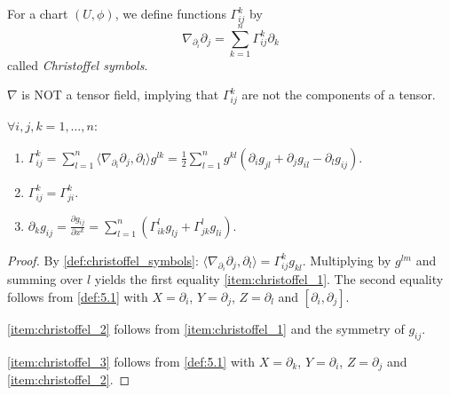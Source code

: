 \begin{definition}\label{def:christoffel_symbols}
For a chart $(U,\phi)$, we define functions $\Gamma_{ij}^k$ by
\[
\nabla_{\partial_i}\partial_j = \sum_{k=1}^n \Gamma_{ij}^k \partial_k
\]
called \emph{Christoffel symbols}.
\end{definition}

\begin{remark}
$\nabla$ is NOT a tensor field, implying that $\Gamma_{ij}^k$ are not the components of a tensor.
\end{remark}

\begin{proposition}\label{prop:christoffel_symbols}
$\forall i, j, k = 1, \dots, n$:
\begin{enumerate}[label=(\arabic*), ref=Proposition \theproposition~(\arabic*)]
    \item \label{item:christoffel_1} $\Gamma_{ij}^k = \sum_{l=1}^n \langle \nabla_{\partial_i}\partial_j, \partial_l\rangle g^{lk} = \frac12 \sum_{l=1}^n g^{kl}(\partial_ig_{jl}+\partial_jg_{il}- \partial_lg_{ij})$.
    \item \label{item:christoffel_2} $\Gamma_{ij}^k = \Gamma_{ji}^k$.
    \item \label{item:christoffel_3} $\partial_kg_{ij} = \frac{\partial g_{ij}}{\partial x^k} = \sum_{l=1}^n (\Gamma_{ik}^lg_{lj} + \Gamma_{jk}^lg_{li})$.
\end{enumerate}
\end{proposition}

\begin{proof}
By \autoref{def:christoffel_symbols}: $\langle \nabla_{\partial_i}\partial_j, \partial_l \rangle = \Gamma_{ij}^k g_{kl}$.
Multiplying by $g^{lm}$ and summing over $l$ yields the first equality \autoref{item:christoffel_1}.
The second equality follows from \autoref{def:5.1} with
$X = \partial_i$, $Y = \partial_j$, $Z = \partial_l$ and $[\partial_i, \partial_j]$.

\autoref{item:christoffel_2} follows from \autoref{item:christoffel_1} and the symmetry of $g_{ij}$.

\autoref{item:christoffel_3} follows from \autoref{def:5.1} with $X = \partial_k$, $Y = \partial_i$, $Z = \partial_j$ and \autoref{item:christoffel_2}.
\end{proof}

